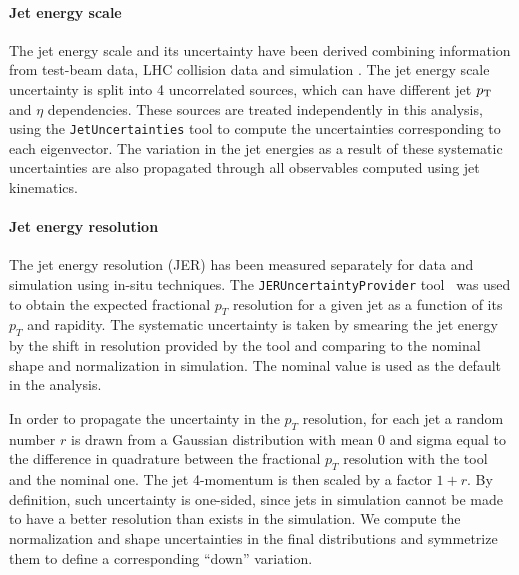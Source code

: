 \paragraph{Jet energy scale}

The jet energy scale and its uncertainty have been derived combining information from test-beam data, 
LHC collision data and simulation \cite{JESwiki}. The jet
energy scale uncertainty is split into 4 uncorrelated sources, 
which can have different jet $p_{{\rm T}}$ and $\eta$ dependencies.  These sources are
treated independently in this analysis, using the \texttt{JetUncertainties} tool \cite{TWiki_JetUncertainties} 
to compute the uncertainties corresponding to each eigenvector. 
The variation in the jet energies as a result of these systematic uncertainties are also propagated through all
observables computed using jet kinematics.

\paragraph{Jet energy resolution}
The jet energy resolution (JER) has been measured separately for data and simulation 
using in-situ techniques. The \texttt{JERUncertaintyProvider}
tool~\cite{jeruncertaintyprovider} was used to obtain the expected fractional
$p_T$ resolution for a given jet as a function of its $p_T$ and rapidity. 
The systematic uncertainty is taken by smearing the jet energy by the shift 
in resolution provided by the tool and comparing to the nominal
shape and normalization in simulation. 
The nominal value is used as the default in the analysis.

In order to propagate the uncertainty in the $p_T$ resolution, for each jet a 
random number $r$ is drawn from a Gaussian distribution with mean 0 and sigma equal 
 to the difference in quadrature between the fractional $p_T$ resolution with the tool and the nominal
one.  The jet 4-momentum is then scaled by a factor $1+r$.  By definition, such uncertainty
is one-sided, since jets in simulation cannot be made to have a better resolution than exists in the simulation.
We compute the normalization and shape uncertainties in the final distributions 
and symmetrize them to define a corresponding ``down'' variation.

\paragraph{\btagging}

